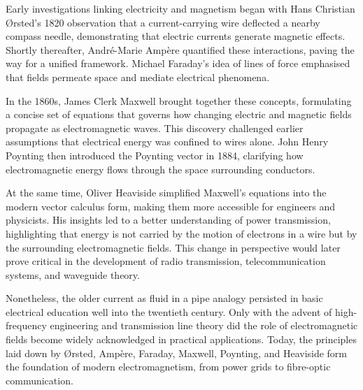 \begin{historical}  
Early investigations linking electricity and magnetism began with Hans Christian Ørsted’s 1820 observation that a current-carrying wire deflected a nearby compass needle, demonstrating that electric currents generate magnetic effects. Shortly thereafter, André-Marie Ampère quantified these interactions, paving the way for a unified framework. Michael Faraday’s idea of lines of force emphasised that fields permeate space and mediate electrical phenomena.  

In the 1860s, James Clerk Maxwell brought together these concepts, formulating a concise set of equations that governs how changing electric and magnetic fields propagate as electromagnetic waves. This discovery challenged earlier assumptions that electrical energy was confined to wires alone. John Henry Poynting then introduced the Poynting vector in 1884, clarifying how electromagnetic energy flows through the space surrounding conductors.  

At the same time, Oliver Heaviside simplified Maxwell’s equations into the modern vector calculus form, making them more accessible for engineers and physicists. His insights led to a better understanding of power transmission, highlighting that energy is not carried by the motion of electrons in a wire but by the surrounding electromagnetic fields. This change in perspective would later prove critical in the development of radio transmission, telecommunication systems, and waveguide theory.  

Nonetheless, the older \QSOpen{}current as fluid in a pipe\QSClose{} analogy persisted in basic electrical education well into the twentieth century. Only with the advent of high-frequency engineering and transmission line theory did the role of electromagnetic fields become widely acknowledged in practical applications. Today, the principles laid down by Ørsted, Ampère, Faraday, Maxwell, Poynting, and Heaviside form the foundation of modern electromagnetism, from power grids to fibre-optic communication.  
\end{historical}